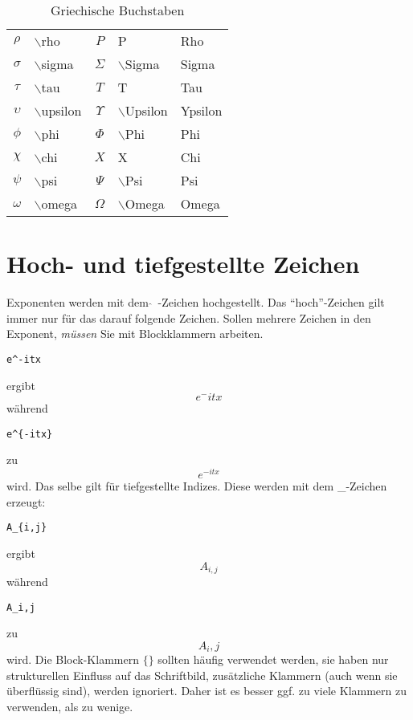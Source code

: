 \begin{table}[t]
\begin{tabular}{c|l|c|l|l}
$\rho $ & $\backslash$rho & $P $ & P & Rho \\
$\sigma $ & $\backslash$sigma & $\Sigma $ & $\backslash$Sigma & Sigma  \\
$\tau $ & $\backslash$tau & $T $ & T & Tau \\
$\upsilon $ & $\backslash$upsilon & $\Upsilon $ & $\backslash$Upsilon & Ypsilon \\
$\phi $ & $\backslash$phi & $\Phi $ & $\backslash$Phi & Phi \\
$\chi $ & $\backslash$chi & $X $ & X & Chi \\
$\psi $ & $\backslash$psi & $\Psi $ & $\backslash$Psi & Psi \\
$\omega $ & $\backslash$omega & $\Omega $ & $\backslash$Omega & Omega \\
\hline
\end{tabular}
\caption{Griechische Buchstaben}
\label{tab:greek}
\end{table}

\section{Hoch- und tiefgestellte Zeichen}

Exponenten werden mit dem $\hat{ }$\ -Zeichen hochgestellt. Das "`hoch"'-Zeichen gilt immer nur für das darauf folgende Zeichen. Sollen mehrere Zeichen in den Exponent, \emph{müssen} Sie mit Blockklammern arbeiten.
\begin{verbatim}
e^-itx
\end{verbatim}
ergibt
\begin{equation}
e^-itx
\end{equation}
während
\begin{verbatim}
e^{-itx}
\end{verbatim}
zu 
\begin{equation}
e^{-itx}
\end{equation}
wird. Das selbe gilt für tiefgestellte Indizes. Diese werden mit dem \_-Zeichen erzeugt:
\begin{verbatim}
A_{i,j}
\end{verbatim}
ergibt
\begin{equation}
A_{i,j}
\end{equation}
während 
\begin{verbatim}
A_i,j
\end{verbatim}
zu
\begin{equation}
A_i,j
\end{equation}
wird. Die Block-Klammern $\lbrace \rbrace$ sollten häufig verwendet werden, sie haben nur strukturellen Einfluss auf das Schriftbild, zusätzliche Klammern (auch wenn sie überflüssig sind), werden ignoriert. Daher ist es besser ggf. zu viele Klammern zu verwenden, als zu wenige.

